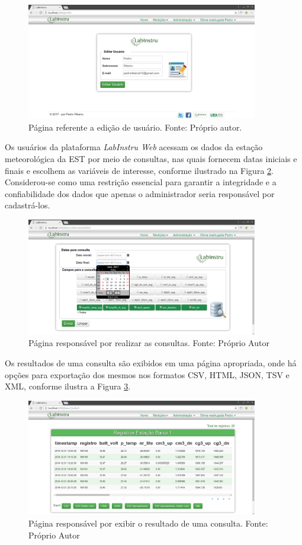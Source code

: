 \begin{figure}[h!]
	\centering
	\includegraphics[width=0.9\textwidth]{./img/ap6.png}
	\caption{Página referente a edição de usuário. Fonte: Próprio autor.} \label{fig:ap6}
\end{figure}


Os usuários da plataforma \emph{LabInstru Web} acessam os dados da estação meteorológica da EST por meio de consultas, nas quais fornecem datas iniciais e finais e escolhem as variáveis de interesse, conforme ilustrado na Figura \ref{fig:ap3}. Considerou-se como uma restrição essencial para garantir a integridade e a confiabilidade dos dados que apenas o administrador seria responsável por cadastrá-los.

\begin{figure}[h!]
	\centering
	\includegraphics[width=0.9\textwidth]{./img/ap3.png}
	\caption{Página responsável por realizar as consultas. Fonte: Próprio Autor} \label{fig:ap3}
\end{figure}

Os resultados de uma consulta são exibidos em uma página apropriada, onde há opções para exportação dos mesmos nos formatos CSV, HTML, JSON, TSV e XML, conforme ilustra a Figura \ref{fig:ap7}.

\begin{figure}[h!]
	\centering
	\includegraphics[width=0.9\textwidth]{./img/ap7.png}
	\caption{Página responsável por exibir o resultado de uma consulta. Fonte: Próprio Autor} \label{fig:ap7}
\end{figure}
